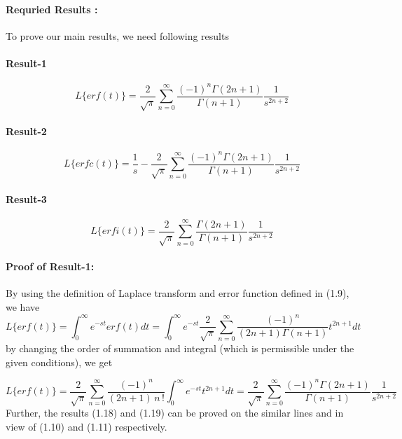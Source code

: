 \documentclass{article}
\begin{document}
\paragraph{Requried Results :\\}
    To prove our main results, we need following results
\paragraph{Result-1}
\begin{equation}
    L \big\{ erf(t) \big\} = 
    \frac{2}{\sqrt{\pi}}
    \sum_{n = 0}^{\infty}
    \frac{{(-1)}^n\Gamma{(2n+1)}}{\Gamma{(n+1)}}
    \frac{1}{s^{2n+2}}
\end{equation}
\paragraph{Result-2}
\begin{equation}
    L \big\{ erfc(t) \big\} = 
    \frac{1}{s}-
    \frac{2}{\sqrt{\pi}}
    \sum_{n = 0}^{\infty}
    \frac{{(-1)}^n\Gamma{(2n+1)}}{\Gamma{(n+1)}}
    \frac{1}{s^{2n+2}}
\end{equation}
\paragraph{Result-3}
\begin{equation}
    L \big\{ erfi(t) \big\} = 
    \frac{2}{\sqrt{\pi}}
    \sum_{n = 0}^{\infty}
    \frac{\Gamma{(2n+1)}}{\Gamma{(n+1)}}
    \frac{1}{s^{2n+2}}
\end{equation}
\paragraph{Proof of Result-1:}
By using the definition of Laplace transform and error function defined in (1.9), we have
\begin{equation*}
    L \big\{ erf(t) \big\}=
    \int_0^{\infty}
    {e^{-st}}erf(t)dt = 
    \int_0^{\infty}
    {e^{-st}}
    \frac{2}{\sqrt{\pi}}
    \sum_{n = 0}^{\infty}
    \frac{{(-1)}^n}{(2n+1)\Gamma{(n+1)}}
    t^{2n+1}dt
\end{equation*}
by changing the order of summation and integral (which is permissible under the given conditions), we get

\begin{equation*}
    L \big\{ erf(t) \big\}=
    \frac{2}{\sqrt{\pi}}
    \sum_{n = 0}^{\infty}
    \frac{{(-1)}^n}{(2n+1)\,n\,!}
    \int_0^{\infty}
    e^{-st}t^{2n+1}dt=
    \frac{2}{\sqrt{\pi}}
    \sum_{n = 0}^{\infty}
    \frac{{(-1)}^n\Gamma{(2n+1)}}{\Gamma{(n+1)}}
    \frac{1}{s^{2n+2}}
\end{equation*}
Further, the results (1.18) and (1.19) can be proved on the similar lines and in view of (1.10) and (1.11) respectively.\\ 
\end{document}
